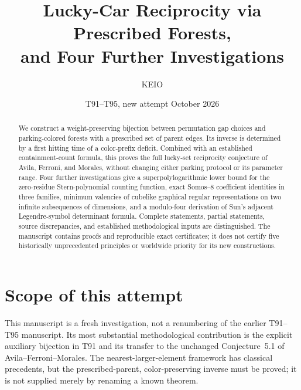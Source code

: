 \documentclass[11pt,a4paper]{article}
\theoremstyle{definition}
\theoremstyle{remark}
\begin{document}
\title{Lucky-Car Reciprocity via Prescribed Forests,\\
and Four Further Investigations}
\author{KEIO}
\date{T91--T95, new attempt\quad\textbar{} October 2026}
\maketitle
\begin{abstract}
We construct a weight-preserving bijection between permutation gap choices
and parking-colored forests with a prescribed set of parent edges. Its
inverse is determined by a first hitting time of a color-prefix deficit.
Combined with an established containment-count formula, this proves the
full lucky-set reciprocity conjecture of Avila, Ferroni, and Morales,
without changing either parking protocol or its parameter range.
Four further investigations give a superpolylogarithmic lower bound for
the zero-residue Stern-polynomial counting function, exact Somos--8
coefficient identities in three families, minimum valencies of cubelike
graphical regular representations on two infinite subsequences of
dimensions, and a modulo-four derivation of Sun's adjacent Legendre-symbol
determinant formula. Complete statements, partial statements, source
discrepancies, and established methodological inputs are distinguished.
The manuscript contains proofs and reproducible exact certificates; it
does not certify five historically unprecedented principles or worldwide
priority for its new constructions.
\end{abstract}

\section*{Scope of this attempt}
This manuscript is a fresh investigation, not a renumbering of the earlier
T91--T95 manuscript. Its most substantial methodological contribution is
the explicit auxiliary bijection in T91 and its transfer to the unchanged
Conjecture~5.1 of Avila--Ferroni--Morales. The nearest-larger-element
framework has classical precedents, but the prescribed-parent,
color-preserving inverse must be proved; it is not supplied merely by
renaming a known theorem.
\end{document}
